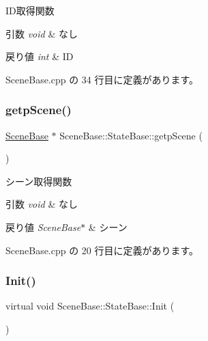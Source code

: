 I\+D取得関数 


\begin{DoxyParams}{引数}
{\em void} & なし \\
\hline
\end{DoxyParams}

\begin{DoxyRetVals}{戻り値}
{\em int} & ID \\
\hline
\end{DoxyRetVals}


 Scene\+Base.\+cpp の 34 行目に定義があります。

\mbox{\label{class_scene_base_1_1_state_base_a5333fd722f17c6da71b09afdc56c84b4}} 
\subsubsection{\texorpdfstring{getp\+Scene()}{getpScene()}}
{\footnotesize\ttfamily \mbox{\hyperlink{class_scene_base}{Scene\+Base}} $\ast$ Scene\+Base\+::\+State\+Base\+::getp\+Scene (\begin{DoxyParamCaption}{ }\end{DoxyParamCaption})}



シーン取得関数 


\begin{DoxyParams}{引数}
{\em void} & なし \\
\hline
\end{DoxyParams}

\begin{DoxyRetVals}{戻り値}
{\em Scene\+Base$\ast$} & シーン \\
\hline
\end{DoxyRetVals}


 Scene\+Base.\+cpp の 20 行目に定義があります。

\mbox{\label{class_scene_base_1_1_state_base_a33350231b039a2178c19beac0211c5b8}} 
\subsubsection{\texorpdfstring{Init()}{Init()}}
{\footnotesize\ttfamily virtual void Scene\+Base\+::\+State\+Base\+::\+Init (\begin{DoxyParamCaption}{ }\end{DoxyParamCaption})\hspace{0.3cm}{\ttfamily [pure virtual]}}



